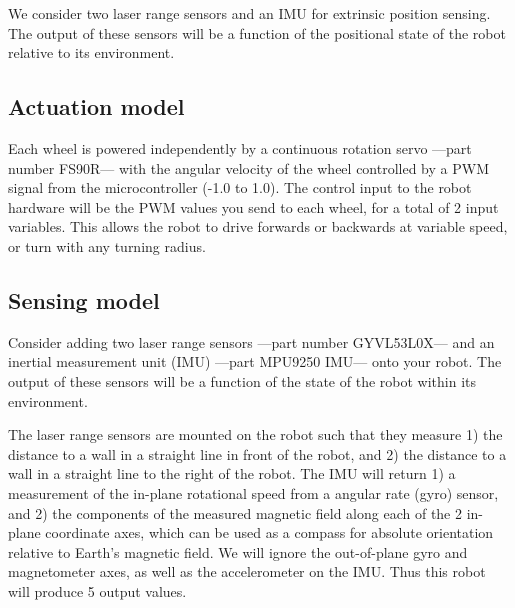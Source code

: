 \documentclass[letterpaper,11pt]{article}
\begin{document}
We consider two laser range sensors and an IMU for extrinsic position sensing.  The output of these sensors will be a function of the positional state of the robot relative to its environment.

\subsection{Actuation model}

Each wheel is powered independently by a continuous rotation servo
---part number FS90R---
with the angular velocity of the wheel controlled by a PWM signal from the microcontroller (-1.0 to 1.0).  
The control input to the robot hardware will be the PWM values you send to each wheel, for a total of 2 input variables.  
This allows the robot to drive forwards or backwards at variable speed, or turn with any turning radius.  




\subsection{Sensing model}

Consider adding two laser range sensors
---part number GYVL53L0X---
and an inertial measurement unit (IMU)
---part MPU9250 IMU--- onto your robot.  %
The output of these sensors will be a function of the state of the robot within its environment.  

The laser range sensors are mounted on the robot such that they measure 1) the distance to a wall in a straight line in front of the robot, and 2) the distance to a wall in a straight line to the right of the robot.  The IMU will return 
1) a measurement of the in-plane rotational speed from a angular rate (gyro) sensor, and 
2) the components of the measured magnetic field along each of the 2 in-plane coordinate axes, which can be used as a compass for absolute orientation relative to Earth's magnetic field.
We will ignore the out-of-plane gyro and magnetometer axes, as well as the accelerometer on the IMU.  Thus this robot will produce 5 output values.
\end{document}
